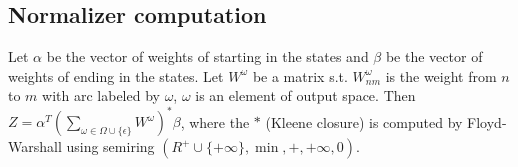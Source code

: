 \subsection*{Normalizer computation}

Let $\mathbb{\alpha}$ be the vector of weights of starting in the states and $\mathbb{\beta}$ be the vector of weights of ending in the states. Let $W^{\omega}$ be a matrix s.t. $W_{nm}^{\omega}$ is the weight from $n$ to $m$ with arc labeled by $\omega$, $\omega$ is an element of output space. Then $Z=\alpha^T (\sum_{\omega\in \Omega\cup \{\epsilon\}} W^{\omega})^* \beta$, where the $*$ (Kleene closure) is computed by Floyd-Warshall using semiring $(R^+\cup\{+\infty\}, \min, +, +\infty, 0)$.
